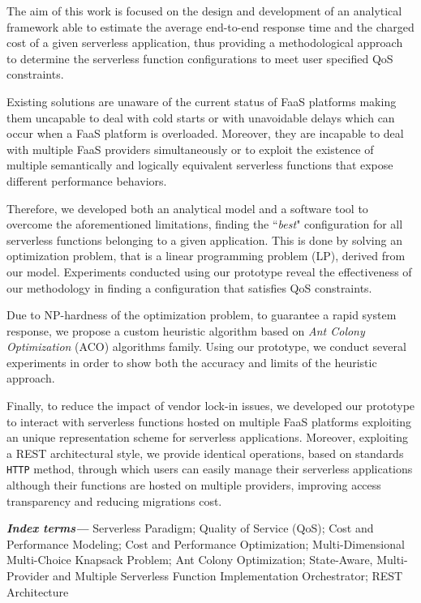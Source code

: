 \documentclass[12pt,a4paper]{report}
\providecommand{\keywords}[1]{\textbf{\textit{Index terms---}} #1}
\newcommand{\ItalicQuotMark}[1]{``\textit{#1}"}
\begin{document}
The aim of this work is focused on the design and development of an analytical framework able to estimate the average end-to-end response time and the charged cost of a given serverless application, thus providing a methodological approach to determine the serverless function configurations to meet user specified QoS constraints.

Existing solutions are unaware of the current status of FaaS platforms making them uncapable to deal with cold starts or with unavoidable delays which can occur when a FaaS platform is overloaded. Moreover, they are incapable to deal with multiple FaaS providers simultaneously or to exploit the existence of multiple semantically and logically equivalent serverless functions that expose different performance behaviors.

Therefore, we developed both an analytical model and a software tool to overcome the aforementioned limitations, finding the \ItalicQuotMark{best} configuration for all serverless functions belonging to a given application. This is done by solving an optimization problem, that is a linear programming problem (LP), derived from our model. Experiments conducted using our prototype reveal the effectiveness of our methodology in finding a configuration that satisfies QoS constraints.

Due to NP-hardness of the optimization problem, to guarantee a rapid system response, we propose a custom heuristic algorithm based on \textit{Ant Colony Optimization} (ACO) algorithms family. Using our prototype, we conduct several experiments in order to show both the accuracy and limits of the heuristic approach.

Finally, to reduce the impact of vendor lock-in issues, we developed our prototype to interact  with serverless functions hosted on multiple FaaS platforms exploiting an unique representation scheme for serverless applications. Moreover, exploiting a REST architectural style, we provide identical operations, based on standards \texttt{HTTP} method, through which users can easily manage their serverless applications although their functions are hosted on multiple providers, improving access transparency and reducing migrations cost.

\vfill
\keywords{Serverless Paradigm; Quality of Service (QoS); Cost and Performance Modeling; Cost and Performance Optimization; Multi-Dimensional Multi-Choice Knapsack Problem; Ant Colony Optimization; State-Aware, Multi-Provider and Multiple Serverless Function Implementation Orchestrator; REST Architecture}
\end{document}
